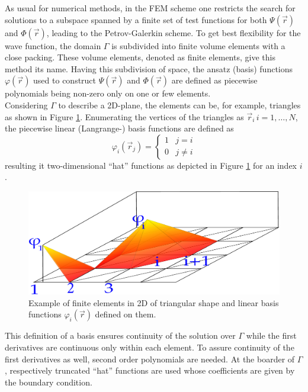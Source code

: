 {As usual for numerical methods, in the FEM scheme one restricts the search for solutions to a subspace spanned by a finite set of test functions for both $\Psi(\vec{r})$ and $\Phi(\vec{r})$, leading to the Petrov-Galerkin scheme.
To get best flexibility for the wave function, the domain $\Gamma$ is subdivided into finite volume elements with a close packing.
These volume elements, denoted as finite elements, give this method its name.
Having this subdivision of space, the ansatz (basis) functions $\varphi(\vec{r})$ used to construct $\Psi(\vec{r})$ and $\Phi(\vec{r})$ are defined as piecewise polynomials being non-zero only on one or few elements.\\
Considering $\Gamma$ to describe a 2D-plane, the elements can be, for example, triangles as shown in Figure \ref{fig:2Del}.
Enumerating the vertices of the triangles as $\vec{r}_i\, i=1,\hdots ,N $, the piecewise linear (Langrange-) basis functions are defined as
\begin{equation}\label{eq:femAnsatz}
   \varphi_i(\vec{r}_j)=
           \begin{cases} 1  & j=i \\
                         0  & j\neq i \end{cases}
\end{equation}
resulting it two-dimensional ``hat'' functions as depicted in Figure \ref{fig:2Del} for an index $i$.
\begin{figure}
   \includegraphics[width=.75\textwidth]{Figures/FEM2d-crop}
   \caption{Example of finite elements in 2D of triangular shape and linear basis functions $\varphi_i(\vec{r})$ defined on them.}
   \label{fig:2Del}
\end{figure}
This definition of a basis ensures continuity of the solution over $\Gamma$ while the first derivatives are continuous only within each element.
To assure continuity of the first derivatives as well, second order polynomials are needed.
At the boarder of $\Gamma$, respectively truncated ``hat'' functions are used whose coefficients are given by the boundary condition.

}
